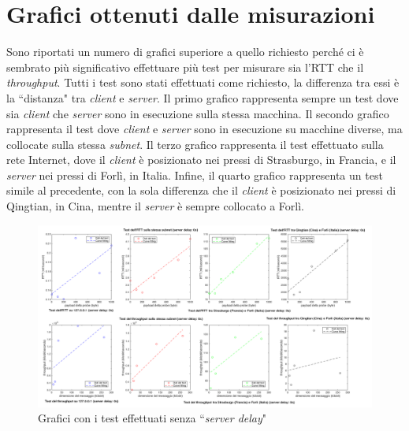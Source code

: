 \documentclass[a4paper, 12pt]{report}
\begin{document}
\section{Grafici ottenuti dalle misurazioni}

Sono riportati un numero di grafici superiore a quello richiesto perché ci è sembrato più significativo effettuare più test per misurare sia l'RTT
che il \textit{throughput}. Tutti i test sono stati effettuati come richiesto, la differenza tra essi è la ``distanza" tra \textit{client} e
\textit{server}. Il primo grafico rappresenta sempre un test dove sia \textit{client} che \textit{server} sono in esecuzione sulla stessa macchina.
Il secondo grafico rappresenta il test dove \textit{client} e \textit{server} sono in esecuzione su macchine diverse, ma collocate sulla stessa
\textit{subnet}. Il terzo grafico rappresenta il test effettuato sulla rete Internet, dove il \textit{client} è posizionato nei pressi di Strasburgo,
in Francia, e il \textit{server} nei pressi di Forlì, in Italia. Infine, il quarto grafico rappresenta un test simile al precedente, con la sola
differenza che il \textit{client} è posizionato nei pressi di Qingtian, in Cina, mentre il \textit{server} è sempre collocato a Forlì.

\begin{figure}[H]
	\centering
	\includegraphics[width=\linewidth]{images/nodelay.png}
	\caption{Grafici con i test effettuati senza ``\textit{server delay}"}
\end{figure}
\end{document}
